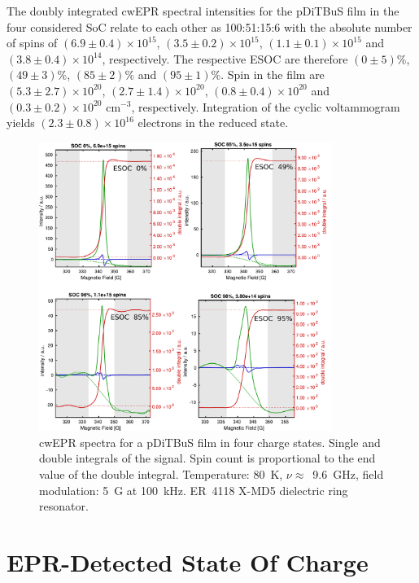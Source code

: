 The doubly integrated cwEPR spectral intensities for the pDiTBuS film in the four considered SoC relate to each other as 100:51:15:6 with the absolute number of spins of $(6.9\pm0.4)\times10^{15}$, $(3.5\pm0.2)\times10^{15}$, $(1.1\pm0.1)\times10^{15}$ and $(3.8\pm0.4)\times10^{14}$, respectively. The respective ESOC are therefore $(0\pm5)$\%, $(49\pm3)$\%, $(85\pm2)$\% and $(95\pm1)$\%. Spin  in the film are $(5.3\pm2.7)\times10^{20}$, $(2.7\pm1.4)\times10^{20}$, $(0.8\pm0.4)\times10^{20}$ and $(0.3\pm0.2)\times10^{20}$ cm$^{-3}$, respectively. Integration of the cyclic voltammogram yields $(2.3\pm0.8)\times10^{16}$ electrons in the reduced state.\\
\begin{figure}[h]
\center
	\includegraphics[width=0.85\textwidth]{./pulse/figures/Figure_S6}
	\caption{cwEPR spectra for a pDiTBuS film in four charge states. Single and double integrals of the signal. Spin count is proportional to the end value of the double integral. Temperature: 80~K, $\nu\approx$~9.6~GHz, field modulation: 5~G at 100~kHz. ER~4118 X-MD5 dielectric ring resonator.}
	\label{fig:Figure_S6}
\end{figure}




\section{EPR-Detected State Of Charge}
\label{sec:ESOC}

